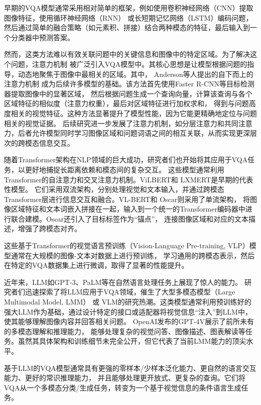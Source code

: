 早期的VQA模型通常采用相对简单的框架，例如使用卷积神经网络（CNN）提取图像特征，使用循环神经网络（RNN）
或长短期记忆网络（LSTM）编码问题，然后通过简单的融合策略（如元素积、拼接）结合两种模态的特征，最后输入到一个分类器中预测答案。

然而，这类方法难以有效关联问题中的关键信息和图像中的特定区域。为了解决这个问题，注意力机制
被广泛引入VQA模型中。其核心思想是让模型根据问题的指导，动态地聚焦于图像中最相关的区域。其中， Anderson等人提出的自下而上的注意力机制\cite{anderson2018bottom}
成为后续许多模型的基础。该方法首先使用Faster R-CNN等目标检测器提取图像中的显著区域，
然后根据问题生成一个查询向量，计算该查询与各个区域特征的相似度（注意力权重），最后对区域特征进行加权求和，
得到与问题高度相关的视觉特征。这种方法显著提升了模型性能，因为它能更精确地定位与问题相关的视觉证据。
后续研究进一步发展了注意力机制，如分层注意力\cite{lu2016hierarchical}和共同注意力，后者允许模型同时学习图像区域和问题词语之间的相互关联，从而实现更深层次的跨模态信息交互。

随着Transformer架构在NLP领域的巨大成功，研究者们也开始将其应用于VQA任务，以更好地捕捉长距离依赖和模态间的复杂交互。
这些模型通常利用Transformer的自注意力和交叉注意力机制。ViLBERT\cite{lu2019vilbert}和 LXMERT\cite{tan2019lxmert}是早期的代表性模型。
它们采用双流架构，分别处理视觉和文本输入，并通过跨模态Transformer层进行信息交互和融合。VL-BERT\cite{su2019vl}和 Oscar\cite{li2020oscar}则采用了单流架构，
将图像区域特征和文本词嵌入拼接在一起，输入到一个统一的Transformer编码器中进行联合建模。Oscar还引入了目标标签作为“锚点”，
连接图像区域和对应的文本描述，增强了跨模态对齐。

这些基于Transformer的视觉语言预训练（Vision-Language Pre-training, VLP）模型通常在大规模的图像-文本对数据上进行预训练，
学习通用的跨模态表示，然后在特定的VQA数据集上进行微调，取得了显著的性能提升。

近年来，LLM如GPT-3、PaLM等在自然语言处理任务上展现了惊人的能力。
研究者们迅速探索了将LLM应用于VQA领域，催生了大型多模态模型（Large Multimodal Model, LMM） 或 
VLM的研究热潮。这类模型通常利用预训练好的强大LLM作为基础，通过设计特定的接口或适配器将视觉信息“注入”到LLM中，使其能够理解图像内容并回答相关问题。
OpenAI发布的GPT-4V\cite{openai2023gpt4v}展示了前所未有的多模态理解和推理能力，
能够处理复杂的视觉问答、图像描述、图表解读等任务。虽然其具体架构和训练细节未完全公开，但它代表了当前LMM能力的顶尖水平。

基于LLM的VQA模型通常具有更强的零样本/少样本泛化能力、更自然的语言交互能力、更好的常识推理能力，
并且能够处理更开放式、更复杂的查询。它们将VQA从一个多模态分类/生成任务，转变为一个基于视觉信息的条件语言生成任务。

